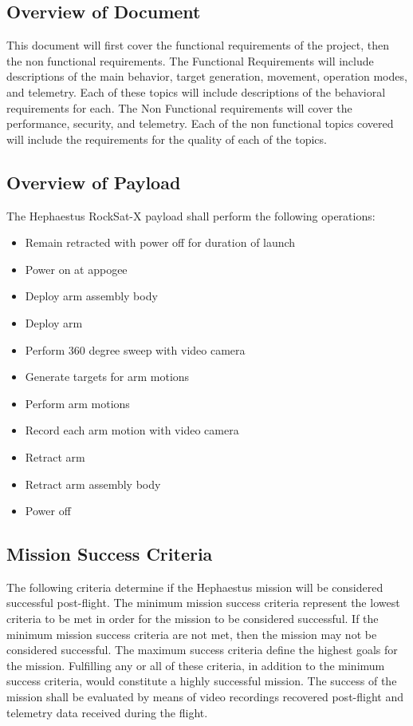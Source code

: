 \documentclass[letterpaper,10pt]{article}
\begin{document}
\subsection{Overview of Document}
This document will first cover the functional requirements of the project, then the non functional requirements.
The Functional Requirements will include descriptions of the main behavior, target generation, movement, operation modes, and telemetry.
Each of these topics will include descriptions of the behavioral requirements for each.
The Non Functional requirements will cover the performance, security, and telemetry.
Each of the non functional topics covered will include the requirements for the quality of each of the topics.
\subsection{Overview of Payload}
The Hephaestus RockSat-X payload shall perform the following operations:
\begin{itemize}
\item{Remain retracted with power off for duration of launch}
\item{Power on at appogee}
\item{Deploy arm assembly body}
\item{Deploy arm}
\item{Perform 360 degree sweep with video camera}
\item{Generate targets for arm motions}
\item{Perform arm motions}
\item{Record each arm motion with video camera}
\item{Retract arm}
\item{Retract arm assembly body}
\item{Power off}
\end{itemize}
\subsection{Mission Success Criteria}
The following criteria determine if the Hephaestus mission will be considered successful post-flight.
The minimum mission success criteria represent the lowest criteria to be met in order for the mission to be considered successful.
If the minimum mission success criteria are not met, then the mission may not be considered successful.
The maximum success criteria define the highest goals for the mission.
Fulfilling any or all of these criteria, in addition to the minimum success criteria, would constitute a highly successful mission.
The success of the mission shall be evaluated by means of video recordings recovered post-flight and telemetry data received during the flight.
\end{document}
